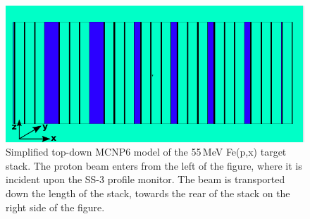 \begin{figure}
 \centering
 \includegraphics[trim = 0mm 0mm 2mm 0mm, clip,width=0.75\columnwidth]{./figures/88_55MeV_stack_nolabels_axes.png}
 \caption{Simplified top-down MCNP6 model of the 55\,MeV Fe(p,x) target stack. The  proton beam enters from the left of the figure, where it is incident upon the SS-3 profile monitor. The beam is transported down the length of the stack, towards the rear of the stack on the right side of the figure.
}
 \label{fig:fe_vised_55}
\end{figure}


